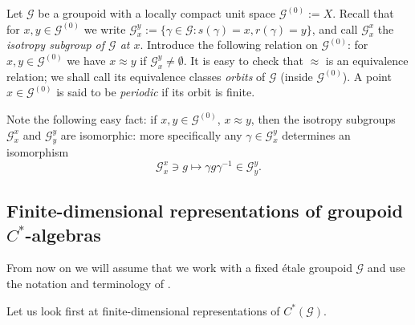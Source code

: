 \documentclass[11 pt, leqno, hidelinks]{amsart}%
\theoremstyle{plain}
\numberwithin{equation}{section}
\newcommand{\GG}{\mathcal{G}}
\begin{document}
\medskip

Let $\GG$ be a groupoid with a locally compact unit space $\GG^{(0)}:=X$. Recall that for $x,y \in \GG^{(0)}$ we write $\GG_x^y:=\{\gamma \in \GG: s(\gamma)=x, r(\gamma) = y\}$, and call  $\GG_x^x$ the \emph{isotropy subgroup of $\GG$ at $x$}. Introduce the following  relation on $\GG^{(0)}$: for $x,y \in \GG^{(0)}$ we have $x\approx y$ if $\GG_x^y\neq \emptyset$. It is easy to check that $\approx$ is an equivalence relation; we shall call its equivalence classes \emph{orbits} of $\GG$ (inside $\GG^{(0)}$). A point $x\in \GG^{(0)}$ is said to be \emph{periodic} if its orbit is finite.



Note the following easy fact: if $x,y \in \GG^{(0)}$, $x\approx y$, then the isotropy subgroups
$\GG_x^x$ and $\GG_y^y$ are isomorphic: more specifically any $\gamma \in  \GG_x^y$ determines an isomorphism
\[ \GG_x^x \ni g \mapsto  \gamma g \gamma^{-1}\in \GG_y^y.\]





\subsection*{Finite-dimensional representations of groupoid $C^*$-algebras}

From now on we will assume that we work with a fixed  \'etale groupoid $\GG$  and use the notation and terminology of \cite{Aidan}.

Let us look first at finite-dimensional %
representations of $C^*(\GG)$.
\end{document}
